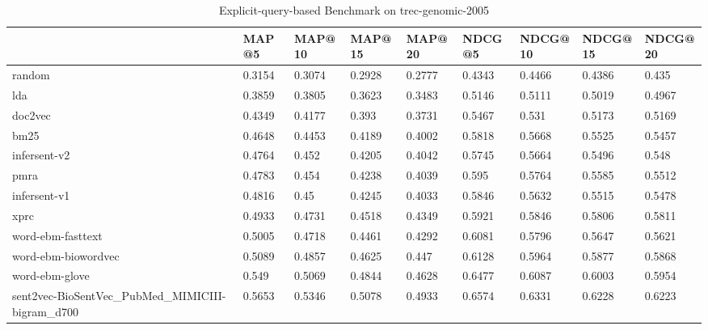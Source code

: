 \begin{table}
\centering
\caption{Explicit-query-based Benchmark on trec-genomic-2005}
\label{tab:query-benchmark-trec-genomic-2005}
\begin{tabular}{lllllllll}
\toprule
{} &    MAP@5 &  MAP@10 &  MAP@15 &  MAP@20 &   NDCG@5 & NDCG@10 & NDCG@15 & NDCG@20 \\
\midrule
random                                          &   0.3154 &  0.3074 &  0.2928 &  0.2777 &   0.4343 &  0.4466 &  0.4386 &   0.435 \\
lda                                             &   0.3859 &  0.3805 &  0.3623 &  0.3483 &   0.5146 &  0.5111 &  0.5019 &  0.4967 \\
doc2vec                                         &   0.4349 &  0.4177 &   0.393 &  0.3731 &   0.5467 &   0.531 &  0.5173 &  0.5169 \\
bm25                                            &   0.4648 &  0.4453 &  0.4189 &  0.4002 &   0.5818 &  0.5668 &  0.5525 &  0.5457 \\
infersent-v2                                    &   0.4764 &   0.452 &  0.4205 &  0.4042 &   0.5745 &  0.5664 &  0.5496 &   0.548 \\
pmra                                            &   0.4783 &   0.454 &  0.4238 &  0.4039 &    0.595 &  0.5764 &  0.5585 &  0.5512 \\
infersent-v1                                    &   0.4816 &    0.45 &  0.4245 &  0.4033 &   0.5846 &  0.5632 &  0.5515 &  0.5478 \\
xprc                                            &   0.4933 &  0.4731 &  0.4518 &  0.4349 &   0.5921 &  0.5846 &  0.5806 &  0.5811 \\
word-ebm-fasttext                               &   0.5005 &  0.4718 &  0.4461 &  0.4292 &   0.6081 &  0.5796 &  0.5647 &  0.5621 \\
word-ebm-biowordvec                             &   0.5089 &  0.4857 &  0.4625 &   0.447 &   0.6128 &  0.5964 &  0.5877 &  0.5868 \\
word-ebm-glove                                  &    0.549 &  0.5069 &  0.4844 &  0.4628 &   0.6477 &  0.6087 &  0.6003 &  0.5954 \\
sent2vec-BioSentVec\_PubMed\_MIMICIII-bigram\_d700 &   0.5653 &  0.5346 &  0.5078 &  0.4933 &   0.6574 &  0.6331 &  0.6228 &  0.6223 \\
\bottomrule
\end{tabular}
\end{table}


